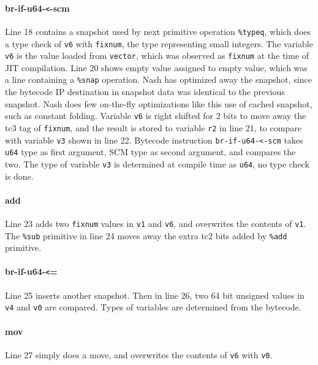\documentclass[preprint, 10pt]{sigplanconf}
\begin{document}
\paragraph{br-if-u64-\texttt{<}-scm} Line 18 contains a snapshot used by next
primitive operation \texttt{\%typeq}, which does a type check of \texttt{v6}
with \texttt{fixnum}, the type representing small integers. The variable
\texttt{v6} is the value loaded from \texttt{vector}, which was observed as
\texttt{fixnum} at the time of JIT compilation. Line 20 shows empty value
assigned to empty value, which was a line containing a \texttt{\%snap}
operation. Nash has optimized away the snapshot, since the bytecode IP
destination in snapshot data was identical to the previous snapshot. Nash does
few on-the-fly optimizations like this use of cached snapshot, such as constant
folding.  Variable \texttt{v6} is right shifted for 2 bits to move away the tc3
tag of \texttt{fixnum}, and the result is stored to variable \texttt{r2} in line
21, to compare with variable \texttt{v3} shown in line 22. Bytecode instruction
\texttt{br-if-u64-<-scm} takes \texttt{u64} type as first argument, SCM type as
second argument, and compares the two. The type of variable \texttt{v3} is
determined at compile time as \texttt{u64}, no type check is done.

\paragraph{add} Line 23 adds two \texttt{fixnum} values in \texttt{v1} and
\texttt{v6}, and overwrites the contents of \texttt{v1}. The \texttt{\%sub}
primitive in line 24 moves away the extra tc2 bits added by \texttt{\%add}
primitive.

\paragraph{br-if-u64-\texttt{<}=} Line 25 inserts another snapshot. Then in line
26, two 64 bit unsigned values in \texttt{v4} and \texttt{v0} are
compared. Types of variables are determined from the bytecode.

\paragraph{mov} Line 27 simply does a move, and overwrites the contents of
\texttt{v6} with \texttt{v0}.
\end{document}
